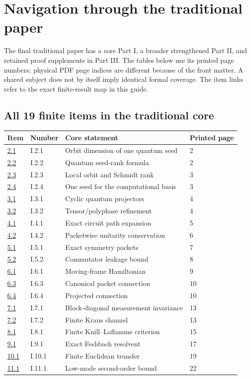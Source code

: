 \section{Navigation through the traditional paper}
\label{sec:traditional-navigation}
The final traditional paper has a core Part I, a broader strengthened Part II, and retained proof supplements in Part III. The tables below use its printed page numbers; physical PDF page indices are different because of the front matter. A shared subject does not by itself imply identical formal coverage. The item links refer to the exact finite-result map in this guide.

\subsection{All 19 finite items in the traditional core}
\begin{longtable}{@{}p{.10\linewidth}p{.14\linewidth}p{.51\linewidth}p{.17\linewidth}@{}}\toprule Item & Number & Core statement & Printed page\\\midrule\endhead
\hyperref[result:2.1]{2.1} & I.2.1 & Orbit dimension of one quantum seed & 2\\
\hyperref[result:2.2]{2.2} & I.2.2 & Quantum seed-rank formula & 2\\
\hyperref[result:2.3]{2.3} & I.2.3 & Local orbit and Schmidt rank & 3\\
\hyperref[result:2.4]{2.4} & I.2.4 & One seed for the computational basis & 3\\
\hyperref[result:3.1]{3.1} & I.3.1 & Cyclic quantum projectors & 4\\
\hyperref[result:3.2]{3.2} & I.3.2 & Tensor/polyphase refinement & 4\\
\hyperref[result:4.1]{4.1} & I.4.1 & Exact circuit path expansion & 5\\
\hyperref[result:4.2]{4.2} & I.4.2 & Packetwise unitarity conservation & 6\\
\hyperref[result:5.1]{5.1} & I.5.1 & Exact symmetry packets & 7\\
\hyperref[result:5.2]{5.2} & I.5.2 & Commutator leakage bound & 8\\
\hyperref[result:6.1]{6.1} & I.6.1 & Moving-frame Hamiltonian & 9\\
\hyperref[result:6.3]{6.3} & I.6.3 & Canonical packet connection & 10\\
\hyperref[result:6.4]{6.4} & I.6.4 & Projected connection & 10\\
\hyperref[result:7.1]{7.1} & I.7.1 & Block-diagonal measurement invariance & 13\\
\hyperref[result:7.2]{7.2} & I.7.2 & Finite Kraus channel & 13\\
\hyperref[result:8.1]{8.1} & I.8.1 & Finite Knill–Laflamme criterion & 15\\
\hyperref[result:9.1]{9.1} & I.9.1 & Exact Feshbach resolvent & 17\\
\hyperref[result:10.1]{10.1} & I.10.1 & Finite Euclidean transfer & 19\\
\hyperref[result:11.1]{11.1} & I.11.1 & Low-mode second-order bound & 22\\
\bottomrule\end{longtable}
